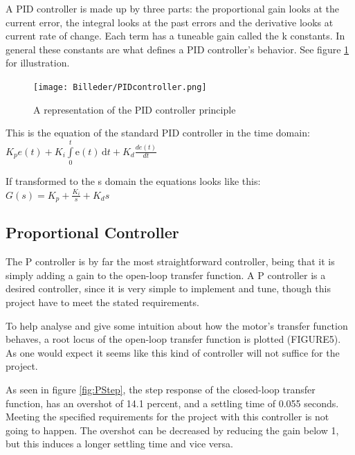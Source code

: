 A PID controller is made up by three parts: the proportional gain looks at the current error, the integral looks at the past errors and the derivative looks at current rate of change. Each term has a tuneable gain called the k constants. In general these constants are what defines a PID controller’s behavior. See figure \ref{fig:PID controller} for illustration. 

\begin{figure}[h!]
\centering
\texttt{[image: Billeder/PIDcontroller.png]}
\caption{ A representation of the PID controller principle }
\label{fig:PID controller}
\end{figure}

This is the equation of the standard PID controller in the time domain:\\$K_{p}e(t)+K_{i} \int\limits_0^t \mathrm{e}(t)\,\mathrm{d}t+K_{d}\frac{de(t)}{dt}$

If transformed to the s domain the equations looks like this:\\
$G(s)=K_{p}+\frac{K_{i}}{s}+K_{d}s$

\subsection{Proportional Controller}

The P controller is by far the most straightforward controller, being that it is simply adding a gain to the open-loop transfer function. A P controller is a desired controller, since it is very simple to implement and tune, though this project have to meet the stated requirements.\par

To help analyse and give some intuition about how the motor’s transfer function behaves, a root locus of the open-loop transfer function is plotted (FIGURE5). As one would expect it seems like this kind of controller will not suffice for the project.\par

As seen in figure \ref{fig:PStep}, the step response of the closed-loop transfer function, has an overshot of 14.1 percent, and a settling time of 0.055 seconds. Meeting the specified requirements  for the project with this controller is not going to happen. The overshot can be decreased by reducing the gain below 1, but this induces a longer settling time and vice versa. 

